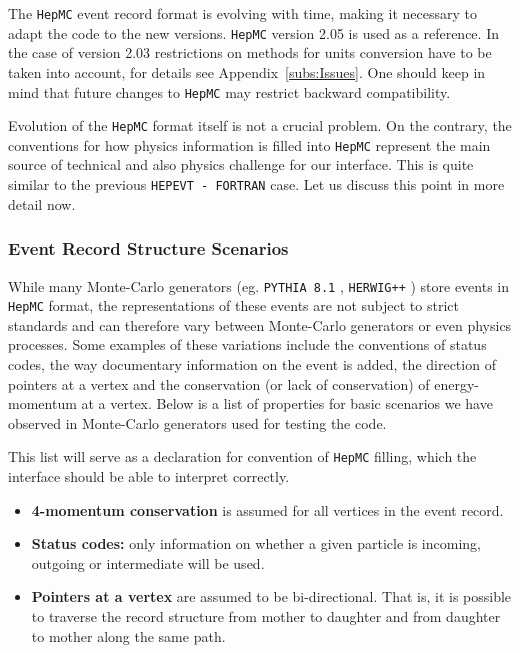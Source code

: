 \documentclass[]{Tauola_interface_design}
\begin{document}
The {\tt HepMC} event record format is  evolving with time, making it necessary
 to adapt
the code to the new versions.
{\tt HepMC} version 2.05 is used as a reference. In the case of version 2.03 restrictions on methods for 
units
conversion have to be taken into account, for details see Appendix~\ref{subs:Issues}.
One should keep in mind that future changes to {\tt HepMC} may restrict
backward compatibility.

Evolution of the {\tt HepMC} format itself is not a crucial problem.
On the contrary, the conventions for how physics information is  filled into {\tt HepMC}
 represent the main source of technical and also physics 
challenge for our interface. 
This is quite similar to the previous
{\tt HEPEVT - FORTRAN} case. Let us discuss this point in more detail now.

\subsubsection{Event Record Structure Scenarios}
\label{sect:Scenarios}
While many Monte-Carlo generators (eg. {\tt PYTHIA 8.1} \cite{Sjostrand:2007gs}, 
{\tt HERWIG++} \cite{Bahr:2008pv})
store events in {\tt HepMC} format, the  representations of
these events are not subject to strict standards and can therefore
vary between Monte-Carlo generators or even physics processes. Some examples
of these variations include the conventions of status codes, the  way
documentary information on the event is added, the direction of pointers at a vertex
and the conservation (or lack of conservation) of energy-momentum at a vertex.
Below is a list of properties for basic scenarios we have observed in Monte-Carlo
generators used for testing the code.

This list will serve as a declaration for convention of  {\tt HepMC} filling, which  the 
interface should  be able to interpret correctly.

\begin{itemize}
  \item \textbf{4-momentum conservation} is assumed for all vertices in the event record.
  \item \textbf{Status codes:} only information on whether a given particle is incoming, outgoing or intermediate will be used.
  \item \textbf{Pointers at a vertex} are assumed to be bi-directional. That is, it is possible to traverse the record structure from mother to daughter and from daughter to mother along the same path.
\end{itemize}
\end{document}
